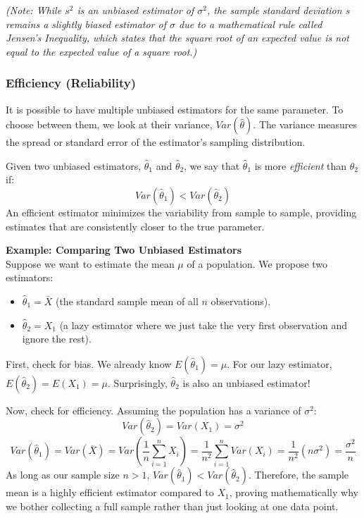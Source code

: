 \documentclass{article}
\begin{document}
\emph{(Note: While $s^2$ is an unbiased estimator of $\sigma^2$, the sample standard deviation $s$ remains a slightly biased estimator of $\sigma$ due to a mathematical rule called Jensen's Inequality, which states that the square root of an expected value is not equal to the expected value of a square root.)}

\subsubsection{Efficiency (Reliability)}
It is possible to have multiple unbiased estimators for the same parameter. To choose between them, we look at their variance, $Var(\hat{\theta})$. The variance measures the spread or standard error of the estimator's sampling distribution. 

Given two unbiased estimators, $\hat{\theta}_1$ and $\hat{\theta}_2$, we say that $\hat{\theta}_1$ is more \emph{efficient} than $\hat{\theta}_2$ if:
$$ Var(\hat{\theta}_1) < Var(\hat{\theta}_2) $$
An efficient estimator minimizes the variability from sample to sample, providing estimates that are consistently closer to the true parameter.

\textbf{Example: Comparing Two Unbiased Estimators} \\
Suppose we want to estimate the mean $\mu$ of a population. We propose two estimators:
\begin{itemize}
    \item $\hat{\theta}_1 = \bar{X}$ (the standard sample mean of all $n$ observations).
    \item $\hat{\theta}_2 = X_1$ (a lazy estimator where we just take the very first observation and ignore the rest).
\end{itemize}
First, check for bias. We already know $E(\hat{\theta}_1) = \mu$. For our lazy estimator, $E(\hat{\theta}_2) = E(X_1) = \mu$. Surprisingly, $\hat{\theta}_2$ is also an unbiased estimator!

Now, check for efficiency. Assuming the population has a variance of $\sigma^2$:
$$ Var(\hat{\theta}_2) = Var(X_1) = \sigma^2 $$
$$ Var(\hat{\theta}_1) = Var(\bar{X}) = Var\left( \frac{1}{n} \sum_{i=1}^{n} X_i \right) = \frac{1}{n^2} \sum_{i=1}^{n} Var(X_i) = \frac{1}{n^2}(n\sigma^2) = \frac{\sigma^2}{n} $$
As long as our sample size $n > 1$, $Var(\hat{\theta}_1) < Var(\hat{\theta}_2)$. Therefore, the sample mean is a highly efficient estimator compared to $X_1$, proving mathematically why we bother collecting a full sample rather than just looking at one data point.
\end{document}
